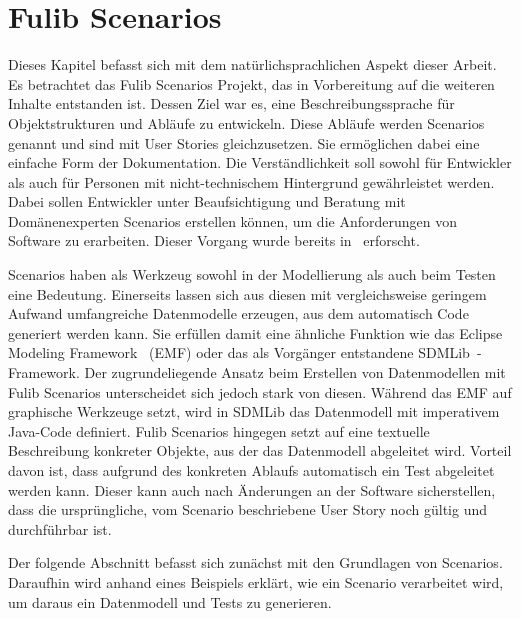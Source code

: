 \chapter{Fulib Scenarios}\label{ch:fulib-scenarios}

Dieses Kapitel befasst sich mit dem natürlichsprachlichen Aspekt dieser Arbeit.
Es betrachtet das Fulib Scenarios Projekt, das in Vorbereitung auf die weiteren Inhalte entstanden ist.
Dessen Ziel war es, eine Beschreibungssprache für Objektstrukturen und Abläufe zu entwickeln.
Diese Abläufe werden Scenarios genannt und sind mit User Stories gleichzusetzen.
Sie ermöglichen dabei eine einfache Form der Dokumentation.
Die Verständlichkeit soll sowohl für Entwickler als auch für Personen mit nicht-technischem Hintergrund gewährleistet werden.
Dabei sollen Entwickler unter Beaufsichtigung und Beratung mit Domänenexperten Scenarios erstellen können, um die Anforderungen von Software zu erarbeiten.
Dieser Vorgang wurde bereits in~\cite{explain} erforscht.

Scenarios haben als Werkzeug sowohl in der Modellierung als auch beim Testen eine Bedeutung.
Einerseits lassen sich aus diesen mit vergleichsweise geringem Aufwand umfangreiche Datenmodelle erzeugen, aus dem automatisch Code generiert werden kann.
Sie erfüllen damit eine ähnliche Funktion wie das Eclipse Modeling Framework~\cite{emf} (EMF) oder das als Vorgänger entstandene SDMLib~\cite{networkparser}-Framework.
Der zugrundeliegende Ansatz beim Erstellen von Datenmodellen mit Fulib Scenarios unterscheidet sich jedoch stark von diesen.
Während das EMF auf graphische Werkzeuge setzt, wird in SDMLib das Datenmodell mit imperativem Java-Code definiert.
Fulib Scenarios hingegen setzt auf eine textuelle Beschreibung konkreter Objekte, aus der das Datenmodell abgeleitet wird.
Vorteil davon ist, dass aufgrund des konkreten Ablaufs automatisch ein Test abgeleitet werden kann.
Dieser kann auch nach Änderungen an der Software sicherstellen, dass die ursprüngliche, vom Scenario beschriebene User Story noch gültig und durchführbar ist.

Der folgende Abschnitt befasst sich zunächst mit den Grundlagen von Scenarios.
Daraufhin wird anhand eines Beispiels erklärt, wie ein Scenario verarbeitet wird, um daraus ein Datenmodell und Tests zu generieren.



